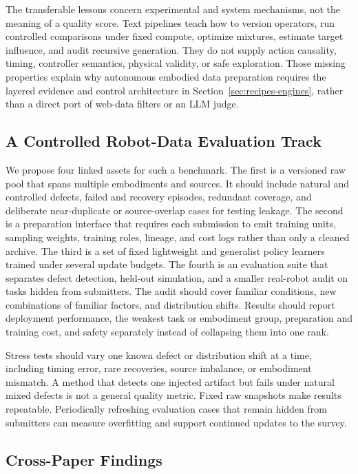 The transferable lessons concern experimental and system mechanisms, not the meaning of a quality score.
Text pipelines teach how to version operators, run controlled comparisons under fixed compute, optimize mixtures, estimate target influence, and audit recursive generation.
They do not supply action causality, timing, controller semantics, physical validity, or safe exploration.
Those missing properties explain why autonomous embodied data preparation requires the layered evidence and control architecture in Section~\ref{sec:recipes-engines}, rather than a direct port of web-data filters or an LLM judge.

\subsection{A Controlled Robot-Data Evaluation Track}

We propose four linked assets for such a benchmark.
The first is a versioned raw pool that spans multiple embodiments and sources.
It should include natural and controlled defects, failed and recovery episodes, redundant coverage, and deliberate near-duplicate or source-overlap cases for testing leakage.
The second is a preparation interface that requires each submission to emit training units, sampling weights, training roles, lineage, and cost logs rather than only a cleaned archive.
The third is a set of fixed lightweight and generalist policy learners trained under several update budgets.
The fourth is an evaluation suite that separates defect detection, held-out simulation, and a smaller real-robot audit on tasks hidden from submitters.
The audit should cover familiar conditions, new combinations of familiar factors, and distribution shifts.
Results should report deployment performance, the weakest task or embodiment group, preparation and training cost, and safety separately instead of collapsing them into one rank.

Stress tests should vary one known defect or distribution shift at a time, including timing error, rare recoveries, source imbalance, or embodiment mismatch.
A method that detects one injected artifact but fails under natural mixed defects is not a general quality metric.
Fixed raw snapshots make results repeatable.
Periodically refreshing evaluation cases that remain hidden from submitters can measure overfitting and support continued updates to the survey.

\subsection{Cross-Paper Findings}

